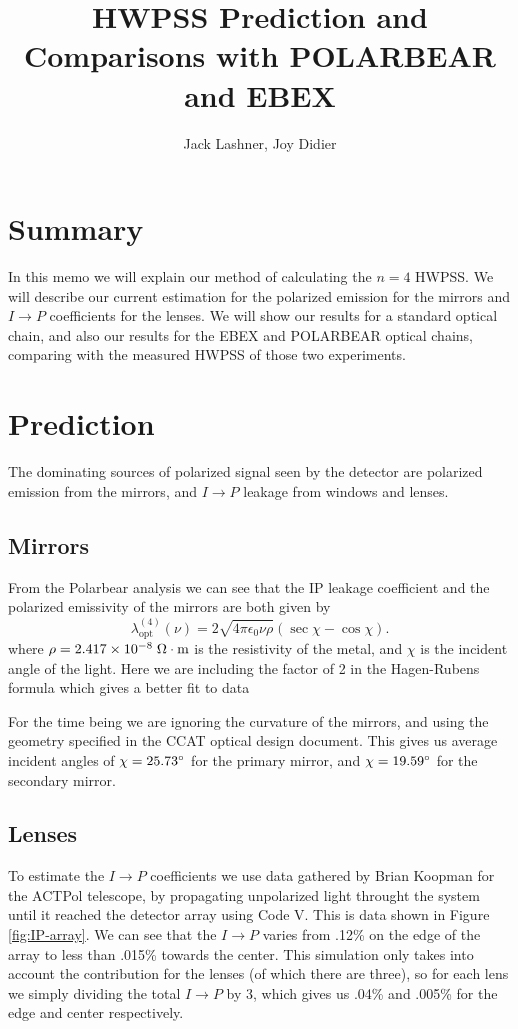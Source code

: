 \documentclass{article}
\title{HWPSS Prediction and Comparisons with POLARBEAR and EBEX}
\author{Jack Lashner, Joy Didier}
\theoremstyle{remark}
\newcommand{\tab}{\hspace*{2em}}
\renewcommand{\t}[1]{\text{#1}}
\newcommand{\lo}{\lambda_\t{opt}^{(4)}}
\newcommand{\ip}{$I\rightarrow P$ }
\begin{document}
\maketitle
\section*{Summary}
\tab In this memo we will explain our method of calculating the $n=4$ HWPSS. 
We will describe our current estimation for the polarized emission for the mirrors and $I\rightarrow P$ coefficients for the lenses. 
We will show our results for a standard optical chain, and also our results for the EBEX and POLARBEAR optical chains,
comparing with the measured HWPSS of those two experiments. 
\section*{Prediction}
\tab The dominating sources of polarized signal seen by the detector are polarized emission from the mirrors, and $I\rightarrow P$ leakage from windows and lenses.

\subsection*{Mirrors}
\tab From the Polarbear analysis \cite{takakura_performance_2017}  we can see that the IP leakage coefficient and the polarized emissivity of the mirrors are both given by
\[\lo(\nu) = 2 \sqrt{4 \pi \epsilon_0 \nu \rho} (\sec\chi - \cos\chi).\]
where $\rho = 2.417\times 10^{-8} \; \ohm \cdot \t{m}$ is the resistivity of the metal, and $\chi$ is the incident angle of the light.
Here we are including the factor of 2 in the Hagen-Rubens formula which gives a better fit to data


\tab For the time being we are ignoring the curvature of the mirrors, and using the geometry specified in the CCAT optical design document.
This gives us average incident angles of $\chi = 25.73 \degree$ for the primary mirror, and $\chi = 19.59\degree$ for the secondary mirror.
\subsection*{Lenses}
\tab To estimate the $I\rightarrow P$ coefficients we use data gathered by Brian Koopman for the ACTPol telescope, by propagating unpolarized light throught the system until it reached the detector array using Code V. 
This is data shown in Figure \ref{fig:IP-array}. 
We can see that the \ip varies from .12\% on the edge of the array to less than .015\% towards the center.
This simulation only takes into account the contribution for the lenses (of which there are three), so for each lens we simply dividing the total \ip by 3, which gives us .04\% and .005\% for the edge and center respectively.
\end{document}
